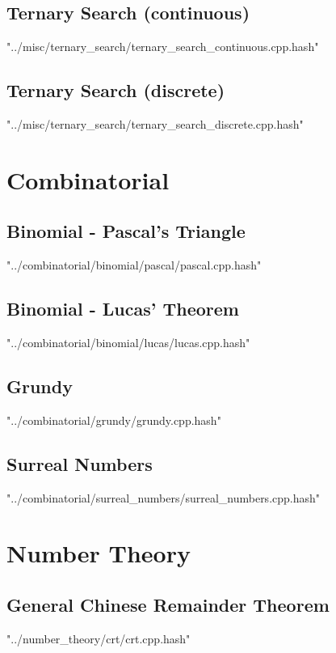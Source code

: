 \documentclass [12pt,onecolumn,oneside]{article}
\begin{document}
\subsection{ Ternary Search (continuous)}
 {"../misc/ternary_search/ternary_search_continuous.cpp.hash"}
\newpage

\subsection{ Ternary Search (discrete)}
 {"../misc/ternary_search/ternary_search_discrete.cpp.hash"}
\newpage

\newpage
\section{Combinatorial}
\subsection{ Binomial - Pascal's Triangle}
 {"../combinatorial/binomial/pascal/pascal.cpp.hash"}
\newpage

\subsection{ Binomial - Lucas' Theorem}
 {"../combinatorial/binomial/lucas/lucas.cpp.hash"}
\newpage

\subsection{ Grundy}
 {"../combinatorial/grundy/grundy.cpp.hash"}
\newpage

\subsection{ Surreal Numbers}
 {"../combinatorial/surreal_numbers/surreal_numbers.cpp.hash"}
\newpage


\section{Number Theory}
\subsection{ General Chinese Remainder Theorem}
 {"../number_theory/crt/crt.cpp.hash"}
\newpage
\end{document}
